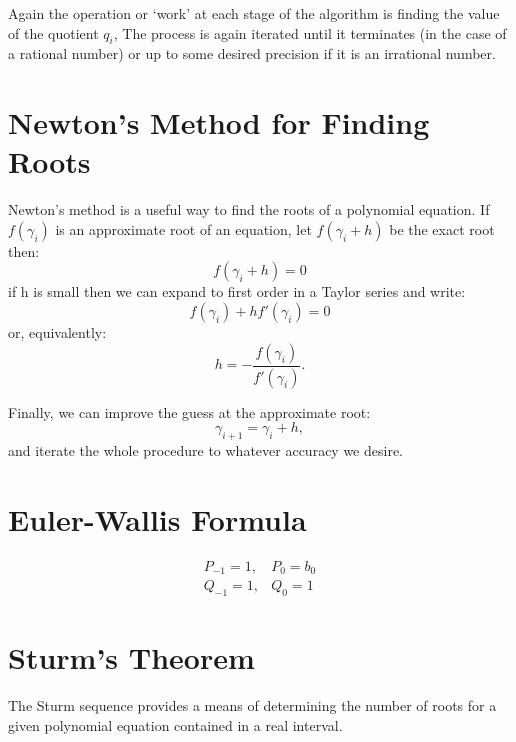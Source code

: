 Again the operation or `work' at each stage of the algorithm
is finding the value of the quotient $q_i$, The process
is again iterated until it terminates (in the case of a rational number)
or up to some desired precision if it is an irrational number.


\section{Newton's Method for Finding Roots}
\label{sec:newtonsmethod}
Newton's method is a useful way to find the roots of a polynomial
equation. If $f(\gamma_i)$ is an approximate root of an equation,
let $f(\gamma_i+h)$ be the exact root then:
%
\begin{equation}
f(\gamma_i+h)=0
\end{equation}
%
if h is small then we can expand to first order in a 
Taylor series and write:
\begin{equation}
f(\gamma_i) + h f'(\gamma_{i})= 0
\end{equation}
%
or, equivalently:
%
\begin{equation}
h = -\frac{f(\gamma_{i})}{f'(\gamma_i)}.
\end{equation}

Finally, we can improve the guess at the approximate root:
%
\begin{equation}
\gamma_{i+1} =  \gamma_{i} + h,
\end{equation}
%
and iterate the whole procedure to whatever accuracy we desire.

\section{Euler-Wallis Formula}

\begin{align}
P_{-1} = 1, & P_{0}= b_{0} \\
Q_{-1} = 1, & Q_{0}= 1 
\end{align}

\section{Sturm's Theorem}
The Sturm sequence provides a means of determining the number of 
roots for a given polynomial equation contained in a real interval.

